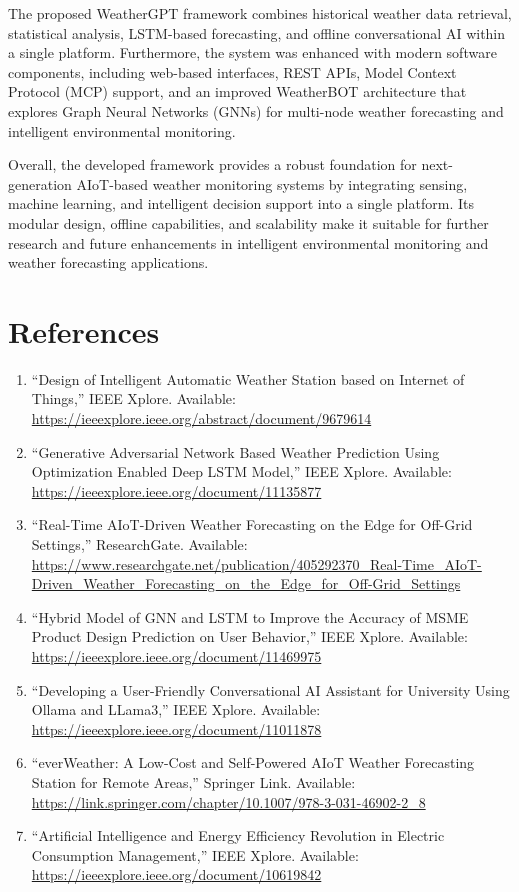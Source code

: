 \documentclass[12pt]{article}
\begin{document}
The proposed WeatherGPT framework combines historical weather data retrieval, statistical analysis, LSTM-based forecasting, and offline conversational AI within a single platform. Furthermore, the system was enhanced with modern software components, including web-based interfaces, REST APIs, Model Context Protocol (MCP) support, and an improved WeatherBOT architecture that explores Graph Neural Networks (GNNs) for multi-node weather forecasting and intelligent environmental monitoring.

Overall, the developed framework provides a robust foundation for next-generation AIoT-based weather monitoring systems by integrating sensing, machine learning, and intelligent decision support into a single platform. Its modular design, offline capabilities, and scalability make it suitable for further research and future enhancements in intelligent environmental monitoring and weather forecasting applications.

\section{References}
\begin{enumerate}
    \item ``Design of Intelligent Automatic Weather Station based on Internet of Things,'' IEEE Xplore. Available: \url{https://ieeexplore.ieee.org/abstract/document/9679614}
    \item ``Generative Adversarial Network Based Weather Prediction Using Optimization Enabled Deep LSTM Model,'' IEEE Xplore. Available: \url{https://ieeexplore.ieee.org/document/11135877}
    \item ``Real-Time AIoT-Driven Weather Forecasting on the Edge for Off-Grid Settings,'' ResearchGate. Available: \url{https://www.researchgate.net/publication/405292370_Real-Time_AIoT-Driven_Weather_Forecasting_on_the_Edge_for_Off-Grid_Settings}
    \item ``Hybrid Model of GNN and LSTM to Improve the Accuracy of MSME Product Design Prediction on User Behavior,'' IEEE Xplore. Available: \url{https://ieeexplore.ieee.org/document/11469975}
    \item ``Developing a User-Friendly Conversational AI Assistant for University Using Ollama and LLama3,'' IEEE Xplore. Available: \url{https://ieeexplore.ieee.org/document/11011878}
    \item ``everWeather: A Low-Cost and Self-Powered AIoT Weather Forecasting Station for Remote Areas,'' Springer Link. Available: \url{https://link.springer.com/chapter/10.1007/978-3-031-46902-2_8}
    \item ``Artificial Intelligence and Energy Efficiency Revolution in Electric Consumption Management,'' IEEE Xplore. Available: \url{https://ieeexplore.ieee.org/document/10619842}
\end{enumerate}
\end{document}

